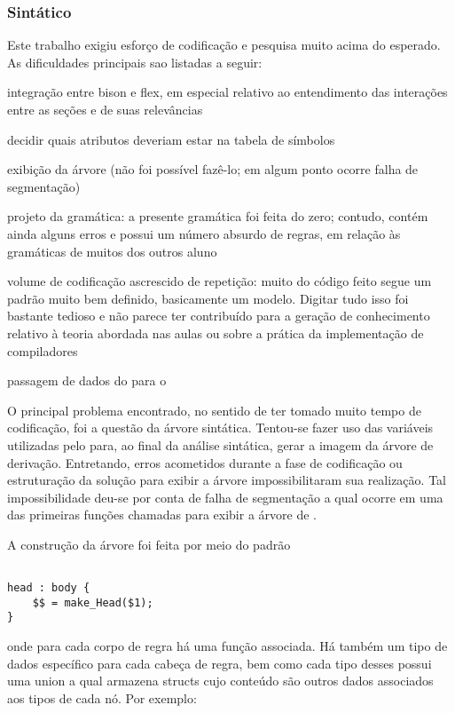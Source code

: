 \documentclass[
	article,			%
	11pt,				%
	oneside,			%
	a4paper,			%
	english,			%
	brazil,				%
	sumario=tradicional
	]{abntex2}
\begin{document}
\subsubsection{Sintático}
Este trabalho exigiu esforço de codificação e pesquisa muito acima do esperado. As dificuldades principais sao listadas a seguir:
\begin{itemize}{
	\item {integração entre bison e flex, em especial relativo ao entendimento das interações entre as seções e de suas relevâncias}
	\item {decidir quais atributos deveriam estar na tabela de símbolos}
	\item{exibição da árvore (não foi possível fazê-lo; em algum ponto ocorre falha de segmentação)}
	\item{projeto da gramática: a presente gramática foi feita do zero; contudo, contém ainda alguns erros e possui um número absurdo de regras, em relação às gramáticas de muitos dos outros aluno}
	\item{volume de codificação ascrescido de repetição: muito do código feito segue um padrão muito bem definido, basicamente um modelo. Digitar tudo isso foi bastante tedioso e não parece ter contribuído para a geração de conhecimento relativo à teoria abordada nas aulas ou sobre a prática da implementação de compiladores}
	\item {passagem de dados do  para o  }
}
\end{itemize}
O principal problema encontrado, no sentido de ter tomado muito tempo de codificação, foi a questão da árvore sintática. Tentou-se fazer uso das variáveis utilizadas pelo  para, ao final da análise sintática, gerar a imagem da árvore de derivação. Entretando, erros acometidos durante a fase de codificação ou estruturação da solução para exibir a árvore impossibilitaram sua realização. Tal impossibilidade deu-se por conta de falha de segmentação a qual ocorre em uma das primeiras funções chamadas para exibir a árvore de  .

A construção da árvore foi feita por meio do padrão 
\begin{lstlisting}[style=CStyle]

head : body {
	$$ = make_Head($1);
}
\end{lstlisting}
onde para cada corpo de regra há uma função  associada. Há também um tipo de dados específico para cada cabeça de regra, bem como cada tipo desses possui uma union a qual armazena structs cujo conteúdo são outros dados associados aos tipos de cada nó. Por exemplo:
\end{document}
